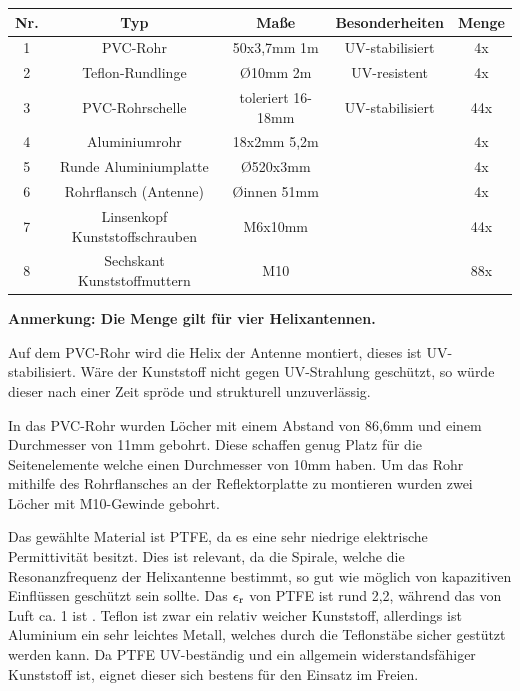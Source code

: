\begin{tabular}{|c|c|c|c|c|}
	\hline
	Nr. & Typ & Maße & Besonderheiten & Menge \\
	\hline
	1 & PVC-Rohr & 50x3,7mm 1m & UV-stabilisiert & 4x \\
	\hline
	2 & Teflon-Rundlinge & \O 10mm 2m & UV-resistent & 4x \\
	\hline
	3 & PVC-Rohrschelle & toleriert 16-18mm & UV-stabilisiert & 44x \\
	\hline
	4 & Aluminiumrohr & 18x2mm 5,2m & & 4x \\
	\hline
	5 & Runde Aluminiumplatte & \O 520x3mm & & 4x \\
	\hline
	6 & Rohrflansch (Antenne) & \O innen 51mm &  & 4x \\
	\hline
	7 & Linsenkopf Kunststoffschrauben & M6x10mm &  & 44x \\
	\hline
	8 & Sechskant Kunststoffmuttern & M10 &  & 88x \\
	\hline
\end{tabular}

\textbf{Anmerkung: Die Menge gilt für vier Helixantennen.}

Auf dem PVC-Rohr wird die Helix der Antenne montiert, dieses ist UV-stabilisiert. Wäre der Kunststoff nicht gegen UV-Strahlung geschützt, so würde dieser nach einer Zeit spröde und strukturell unzuverlässig.

In das PVC-Rohr wurden Löcher mit einem Abstand von 86,6mm und einem Durchmesser von 11mm gebohrt. Diese schaffen genug Platz für die Seitenelemente welche einen Durchmesser von 10mm haben. Um das Rohr mithilfe des Rohrflansches an der Reflektorplatte zu montieren wurden zwei Löcher mit M10-Gewinde gebohrt.

Das gewählte Material ist PTFE, da es eine sehr niedrige elektrische Permittivität besitzt. Dies ist relevant, da die Spirale, welche die Resonanzfrequenz der Helixantenne bestimmt, so gut wie möglich von kapazitiven Einflüssen geschützt sein sollte. Das $\epsilon\textsubscript{r}$ von PTFE ist rund 2,2, während das von Luft ca. 1 ist \cite{lipinski_polytetrafluorethylen_nodate,noauthor_dielektrizitatskonstante_nodate}. Teflon ist zwar ein relativ weicher Kunststoff, allerdings ist Aluminium ein sehr leichtes Metall, welches durch die Teflonstäbe sicher gestützt werden kann. Da PTFE UV-beständig und ein allgemein widerstandsfähiger Kunststoff ist, eignet dieser sich bestens für den Einsatz im Freien.

